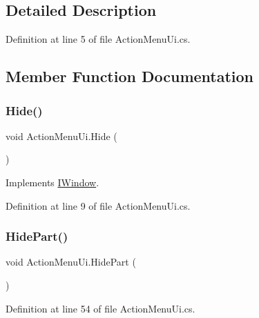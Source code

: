 \subsection{Detailed Description}


Definition at line 5 of file Action\+Menu\+Ui.\+cs.



\subsection{Member Function Documentation}
\mbox{\label{class_action_menu_ui_a205cb239d9c7677519de0bab93018659}} 
\subsubsection{\texorpdfstring{Hide()}{Hide()}}
{\footnotesize\ttfamily void Action\+Menu\+Ui.\+Hide (\begin{DoxyParamCaption}{ }\end{DoxyParamCaption})}



Implements \mbox{\hyperlink{interface_i_window_a829d3aa9bcf80a75ba84968399492378}{I\+Window}}.



Definition at line 9 of file Action\+Menu\+Ui.\+cs.

\mbox{\label{class_action_menu_ui_a3656f512a20980a20263283712bac01d}} 
\subsubsection{\texorpdfstring{HidePart()}{HidePart()}}
{\footnotesize\ttfamily void Action\+Menu\+Ui.\+Hide\+Part (\begin{DoxyParamCaption}{ }\end{DoxyParamCaption})}



Definition at line 54 of file Action\+Menu\+Ui.\+cs.

\mbox{\label{class_action_menu_ui_af5a4e0171f5fcdc35a2464eeb1854a85}} 
